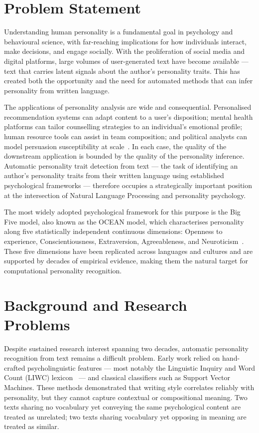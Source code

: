 \documentclass[../main.tex]{subfiles}
\begin{document}
\section{Problem Statement}
\label{sec:problem-statement}

Understanding human personality is a fundamental goal in psychology and behavioural science, with far-reaching implications for how individuals interact, make decisions, and engage socially. With the proliferation of social media and digital platforms, large volumes of user-generated text have become available --- text that carries latent signals about the author's personality traits. This has created both the opportunity and the need for automated methods that can infer personality from written language.

The applications of personality analysis are wide and consequential. Personalised recommendation systems can adapt content to a user's disposition; mental health platforms can tailor counselling strategies to an individual's emotional profile; human resource tools can assist in team composition; and political analysts can model persuasion susceptibility at scale~\cite{mehta2019recent}. In each case, the quality of the downstream application is bounded by the quality of the personality inference. Automatic personality trait detection from text --- the task of identifying an author's personality traits from their written language using established psychological frameworks --- therefore occupies a strategically important position at the intersection of Natural Language Processing and personality psychology.

The most widely adopted psychological framework for this purpose is the Big Five model, also known as the OCEAN model, which characterises personality along five statistically independent continuous dimensions: Openness to experience, Conscientiousness, Extraversion, Agreeableness, and Neuroticism~\cite{mccrae1992introduction}. These five dimensions have been replicated across languages and cultures and are supported by decades of empirical evidence, making them the natural target for computational personality recognition.

\section{Background and Research Problems}
\label{sec:giaiphap}

Despite sustained research interest spanning two decades, automatic personality recognition from text remains a difficult problem. Early work relied on hand-crafted psycholinguistic features --- most notably the Linguistic Inquiry and Word Count (LIWC) lexicon~\cite{pennebaker2001linguistic} --- and classical classifiers such as Support Vector Machines. These methods demonstrated that writing style correlates reliably with personality, but they cannot capture contextual or compositional meaning. Two texts sharing no vocabulary yet conveying the same psychological content are treated as unrelated; two texts sharing vocabulary yet opposing in meaning are treated as similar.
\end{document}
